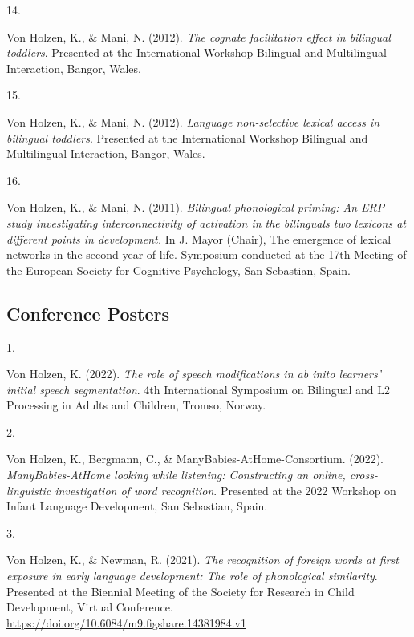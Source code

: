 \documentclass[10pt,a4paper,]{article}
\newlength{\cslhangindent}
\newlength{\csllabelwidth}
\newcommand{\CSLLeftMargin}[1]{\parbox[t]{\csllabelwidth}{\hfill #1~}}
\newcommand{\CSLRightInline}[1]{\parbox[t]{\linewidth - \cslhangindent - \csllabelwidth}{#1}\vspace{0.8ex}}
\begin{document}
\leavevmode{}%
\CSLLeftMargin{14. }%
\CSLRightInline{Von Holzen, K., \& Mani, N. (2012). \emph{The cognate
facilitation effect in bilingual toddlers}. Presented at the
International Workshop Bilingual and Multilingual Interaction, Bangor,
Wales.}

\leavevmode{}%
\CSLLeftMargin{15. }%
\CSLRightInline{Von Holzen, K., \& Mani, N. (2012). \emph{Language
non-selective lexical access in bilingual toddlers}. Presented at the
International Workshop Bilingual and Multilingual Interaction, Bangor,
Wales.}

\leavevmode{}%
\CSLLeftMargin{16. }%
\CSLRightInline{Von Holzen, K., \& Mani, N. (2011). \emph{Bilingual
phonological priming: An ERP study investigating interconnectivity of
activation in the bilinguals two lexicons at different points in
development.} In J. Mayor (Chair), The emergence of lexical networks in
the second year of life. Symposium conducted at the 17th Meeting of the
European Society for Cognitive Psychology, San Sebastian, Spain.}

\hypertarget{conference-posters}{%
\subsection{Conference Posters}\label{conference-posters}}

\hypertarget{bibliography}{}
\leavevmode{}%
\CSLLeftMargin{1. }%
\CSLRightInline{Von Holzen, K. (2022). \emph{The role of speech
modifications in ab inito learners' initial speech segmentation}. 4th
International Symposium on Bilingual and L2 Processing in Adults and
Children, Tromso, Norway.}

\leavevmode{}%
\CSLLeftMargin{2. }%
\CSLRightInline{Von Holzen, K., Bergmann, C., \&
ManyBabies-AtHome-Consortium. (2022). \emph{ManyBabies-AtHome looking
while listening: Constructing an online, cross-linguistic investigation
of word recognition}. Presented at the 2022 Workshop on Infant Language
Development, San Sebastian, Spain.}

\leavevmode{}%
\CSLLeftMargin{3. }%
\CSLRightInline{Von Holzen, K., \& Newman, R. (2021). \emph{The
recognition of foreign words at first exposure in early language
development: The role of phonological similarity}. Presented at the
Biennial Meeting of the Society for Research in Child Development,
Virtual Conference.
\url{https://doi.org/10.6084/m9.figshare.14381984.v1}}
\end{document}
